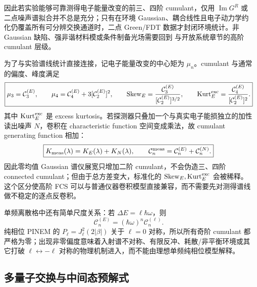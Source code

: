 因此若实验能够可靠测得电子能量改变的前三、四阶 cumulant，仅用 $\operatorname{Im}G^R$ 或二点噪声谱拟合并不总是充分；只有在环境 Gaussian、耦合线性且电子动力学约化仍覆盖所有可分辨交换通道时，二点 Green/FDT 数据才封闭环境统计。非 Gaussian 缺陷、强非谐材料模或条件制备光场需要回到 与开放系统章节的高阶 cumulant 层级。

为了与实验谱线统计直接连接，记电子能量改变的中心矩为 $\mu_n$。cumulant 与通常的偏度、峰度满足
\begin{equation}
\boxed{
\mu_3=\mathcal C_3^{(E)},
\qquad
\mu_4=\mathcal C_4^{(E)}+3[\mathcal C_2^{(E)}]^2,
\qquad
\operatorname{Skew}_E=\frac{\mathcal C_3^{(E)}}{[\mathcal C_2^{(E)}]^{3/2}},
\qquad
\operatorname{Kurt}_{E}^{\rm exc}=\frac{\mathcal C_4^{(E)}}{[\mathcal C_2^{(E)}]^2}.}
\label{eq:energy_fcs_skewness_kurtosis}
\end{equation}
其中 $\operatorname{Kurt}_{E}^{\rm exc}$ 是 excess kurtosis。若探测器只叠加一个与真实电子能损独立的加性读出噪声 $N$，卷积在 characteristic function 空间变成乘法，故 cumulant generating function 相加：
\begin{equation}
\boxed{
K_{\rm meas}(\lambda)
=K_E(\lambda)+K_N(\lambda),
\qquad
\mathcal C_n^{\rm meas}
=\mathcal C_n^{(E)}+\mathcal C_n^{(N)}.}
\label{eq:energy_fcs_detector_cumulant_addition}
\end{equation}
因此零均值 Gaussian 谱仪展宽只增加二阶 cumulant，不会伪造三、四阶 connected cumulant；但由于总方差变大，标准化的 $\operatorname{Skew}_E,\operatorname{Kurt}_{E}^{\rm exc}$ 会被稀释。这个区分使高阶 FCS 可以与普通仪器卷积模型直接兼容，而不需要先对测得谱线做不稳定的逐点反卷积。

单频离散格中还有简单尺度关系：若 $\Delta E=\ell\hbar\omega$，则
\begin{equation}
\boxed{
\mathcal C_n^{(E)}=(\hbar\omega)^n\mathcal C_n^{(\ell)}.}
\label{eq:energy_sideband_cumulant_scaling}
\end{equation}
纯相位 PINEM 的 $P_\ell=J_\ell^2(2|\beta|)$ 关于 $\ell=0$ 对称，所以所有奇阶 cumulant 都严格为零；出现非零偏度意味着入射谱不对称、有限反冲、耗散/非平衡环境或其它打破 $\ell\leftrightarrow-\ell$ 对称的物理机制进入，而不能由理想单频纯相位模型解释。





\subsection{多量子交换与中间态预解式}

